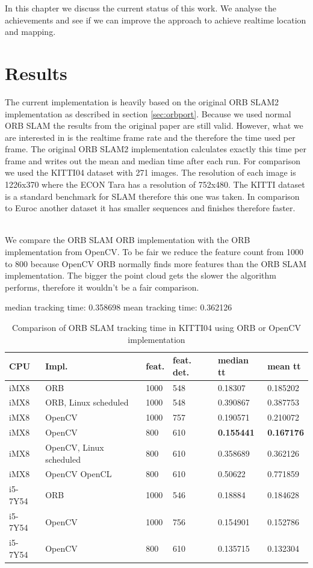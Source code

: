 \documentclass[11pt,a4paper,titlepage,oneside]{report}
\begin{document}
In this chapter we discuss the current status of this work. We analyse the achievements and see if we can improve the approach to achieve realtime location and mapping.

\section{Results}\label{sec:results}

The current implementation is heavily based on the original ORB SLAM2 implementation as described in section \ref{sec:orbport}. Because we used normal ORB SLAM the results from the original paper are still valid. However, what we are interested in is the realtime frame rate and the therefore the time used per frame. The original ORB SLAM2 implementation calculates exactly this time per frame and writes out the mean and median time after each run. For comparison we used the KITTI04 dataset with 271 images. The resolution of each image is 1226x370 where the ECON Tara has a resolution of 752x480. The KITTI dataset is a standard benchmark for SLAM therefore this one was taken. In comparison to Euroc another dataset it has smaller sequences and finishes therefore faster.\\\

We compare the ORB SLAM ORB implementation with the ORB implementation from OpenCV. To be fair we reduce the feature count from 1000 to 800 because OpenCV ORB normally finds more features than the ORB SLAM implementation. The bigger the point cloud gets the slower the algorithm performs, therefore it wouldn't be a fair comparison.

median tracking time: 0.358698
mean tracking time: 0.362126


\begin{table}
	\begin{tabular}{  | l | l | l | l | l | l | }
		\hline
		\textbf{CPU} & \textbf{Impl.} & \textbf{feat.} & \textbf{feat. det.} & \textbf{median tt} & \textbf{mean tt} \\ \hline
		iMX8 & ORB & 1000 &  548 & 0.18307 & 0.185202 \\ \hline
		iMX8 & ORB, Linux scheduled & 1000 & 548 & 0.390867 & 0.387753 \\ \hline
		iMX8 & OpenCV & 1000 & 757 & 0.190571 & 0.210072 \\ \hline
		iMX8 & OpenCV & 800 & 610 & \textbf{0.155441} & \textbf{0.167176} \\ \hline
		iMX8 & OpenCV, Linux scheduled & 800 & 610 & 0.358689 & 0.362126 \\ \hline
		iMX8 & OpenCV OpenCL & 800 & 610 & 0.50622 & 0.771859 \\ \hline
		i5-7Y54 & ORB & 1000 & 546 & 0.18884 & 0.184628 \\ \hline
		i5-7Y54 & OpenCV & 1000 & 756 & 0.154901 & 0.152786 \\ \hline
		i5-7Y54 & OpenCV & 800 & 610 & 0.135715 & 0.132304 \\ \hline
	\end{tabular}
	\caption{Comparison of ORB SLAM tracking time in KITTI04 using ORB or OpenCV implementation}
  \label{tab:result}
\end{table}
\end{document}
